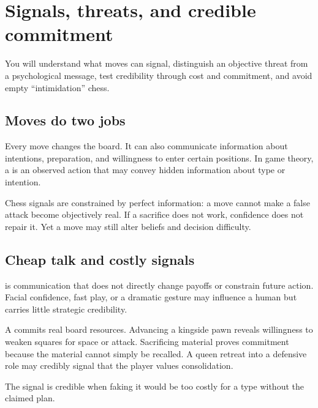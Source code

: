 
\chapter{Signals, threats, and credible commitment}
\begin{learningbox}
You will understand what moves can signal, distinguish an objective threat from a psychological message, test credibility through cost and commitment, and avoid empty ``intimidation'' chess.
\end{learningbox}

\section{Moves do two jobs}
Every move changes the board. It can also communicate information about intentions, preparation, and willingness to enter certain positions. In game theory, a  is an observed action that may convey hidden information about type or intention.

Chess signals are constrained by perfect information: a move cannot make a false attack become objectively real. If a sacrifice does not work, confidence does not repair it. Yet a move may still alter beliefs and decision difficulty.

\section{Cheap talk and costly signals}
 is communication that does not directly change payoffs or constrain future action. Facial confidence, fast play, or a dramatic gesture may influence a human but carries little strategic credibility.

A  commits real board resources. Advancing a kingside pawn reveals willingness to weaken squares for space or attack. Sacrificing material proves commitment because the material cannot simply be recalled. A queen retreat into a defensive role may credibly signal that the player values consolidation.

The signal is credible when faking it would be too costly for a type without the claimed plan.

